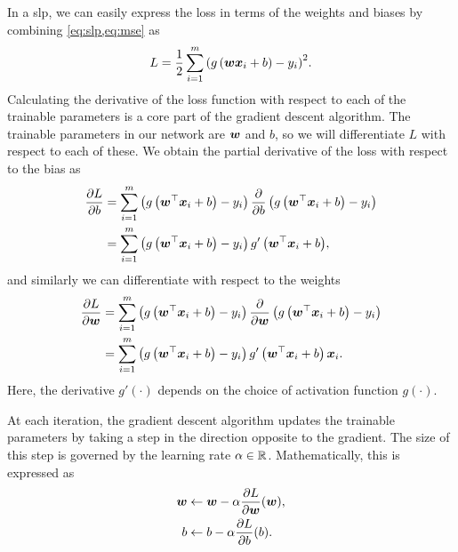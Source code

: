 \documentclass[../report.tex]{subfiles}
\begin{document}
\subsubsection{}
In a \gls{slp}, we can easily express the loss in terms of the weights and biases by combining \cref{eq:slp,eq:mse} as
\begin{equation}
    L = \frac{1}{2} \sum_{i=1}^m{\left(g\left(
        {\bm{w}} {\bm{x}}_i + b
    \right) - y_i\right)^2}.
\end{equation}
Calculating the derivative of the loss function with respect to each of the trainable parameters is a core part of the gradient descent algorithm.
The trainable parameters in our network are ${\bm{w}}$ and $b$, so we will differentiate $L$ with respect to each of these.
We obtain the partial derivative of the loss with respect to the bias as
\begin{align}
    \label{eq:backprop_dL_db}
    \frac{\partial L}{\partial b}
    &= \sum_{i=1}^m{
        \left(g \left({\bm{w}}^\top{\bm{x}}_i+b\right) - y_i \right)
        \frac{\partial}{\partial b} \left(g \left({\bm{w}}^\top{\bm{x}}_i+b\right) - y_i \right)
    } \nonumber \\
    &= \sum_{i=1}^m{
        \left(g \left({\bm{w}}^\top{\bm{x}}_i+b\right) - y_i \right)
        g' \left({\bm{w}}^\top{\bm{x}}_i+b\right)
    },
\end{align}
and similarly we can differentiate with respect to the weights
\begin{align}
    \label{eq:backprop_dL_dw}
    \frac{\partial L}{\partial {\bm{w}}}
    &= \sum_{i=1}^m{
        \left(g \left({\bm{w}}^\top{\bm{x}}_i+b\right) - y_i \right)
        \frac{\partial}{\partial {\bm{w}}} \left(g \left({\bm{w}}^\top{\bm{x}}_i+b\right) - y_i \right)
    } \nonumber \\
    &= \sum_{i=1}^m{
        \left(g \left({\bm{w}}^\top{\bm{x}}_i+b\right) - y_i \right)
        g' \left({\bm{w}}^\top{\bm{x}}_i+b\right)
        {\bm{x}}_i
    }.
\end{align}
Here, the derivative $g'(\cdot)$ depends on the choice of activation function $g(\cdot)$.

At each iteration, the gradient descent algorithm updates the trainable parameters by taking a step in the direction opposite to the gradient.
The size of this step is governed by the learning rate $\alpha \in \mathbb{R}$.
Mathematically, this is expressed as
\begin{align}
    \label{eq:backprop_update_weights}
    {\bm{w}} &\gets {\bm{w}} - \alpha \frac{\partial L}{\partial {\bm{w}}}({\bm{w}}),\\
    \label{eq:backprop_update_bias}
    b &\gets b - \alpha \frac{\partial L}{\partial b}(b).
\end{align}
\end{document}
